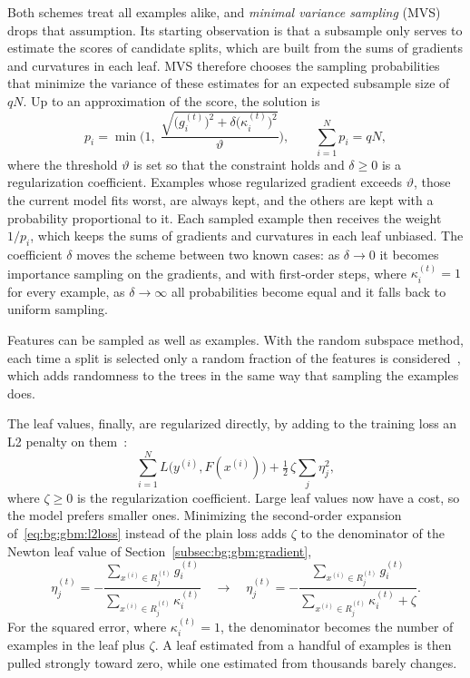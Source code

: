 Both schemes treat all examples alike, and \emph{minimal variance sampling}
(MVS)~\cite{ibragimov2019} drops that assumption. Its starting observation is
that a subsample only serves to estimate the scores of candidate splits, which
are built from the sums of gradients and curvatures in each leaf. MVS
therefore chooses the sampling probabilities that minimize the variance of
these estimates for an expected subsample size of $qN$. Up to an
approximation of the score, the solution is
\begin{equation}
p_i = \min\Biggl( 1,\;
\frac{\sqrt{\bigl(g_i^{(t)}\bigr)^2 + \delta \bigl(\kappa_i^{(t)}\bigr)^2}}{\vartheta} \Biggr),
\qquad \sum_{i=1}^{N} p_i = qN,
\label{eq:bg:gbm:mvs}
\end{equation}
where the threshold $\vartheta$ is set so that the constraint holds and
$\delta \ge 0$ is a regularization coefficient. Examples
whose regularized gradient exceeds $\vartheta$, those the current model fits
worst, are always kept, and the others are kept with a probability
proportional to it. Each sampled example then receives the weight $1/p_i$,
which keeps the sums of gradients and curvatures in each leaf unbiased. The
coefficient $\delta$ moves the scheme between two known cases: as $\delta \to
0$ it becomes importance sampling on the gradients, and with first-order
steps, where $\kappa_i^{(t)} = 1$ for every example, as $\delta \to \infty$
all probabilities become equal and it falls back to uniform sampling.

Features can be sampled as well as examples. With the random subspace method,
each time a split is selected only a random fraction of the features is
considered~\cite{catboostdocs}, which adds randomness to the trees in the same
way that sampling the examples does.

The leaf values, finally, are regularized directly, by adding to the training
loss an L2 penalty on them~\cite{chen2016}:
\begin{equation}
\sum_{i=1}^{N} L\bigl(y^{(i)}, F(x^{(i)})\bigr)
+ \tfrac{1}{2}\, \zeta \sum_{j} \eta_j^{2},
\label{eq:bg:gbm:l2loss}
\end{equation}
where $\zeta \ge 0$ is the regularization coefficient. Large leaf values now
have a cost, so the model prefers smaller ones. Minimizing the second-order
expansion of~\eqref{eq:bg:gbm:l2loss} instead of the plain loss adds $\zeta$
to the denominator of the Newton leaf value of
Section~\ref{subsec:bg:gbm:gradient},
\begin{equation}
\eta_j^{(t)} =
-\frac{\sum_{x^{(i)} \in R_j^{(t)}} g_i^{(t)}}
      {\sum_{x^{(i)} \in R_j^{(t)}} \kappa_i^{(t)}}
\quad \longrightarrow \quad
\eta_j^{(t)} =
-\frac{\sum_{x^{(i)} \in R_j^{(t)}} g_i^{(t)}}
      {\sum_{x^{(i)} \in R_j^{(t)}} \kappa_i^{(t)} + \zeta}.
\label{eq:bg:gbm:l2leaf}
\end{equation}
For the squared error, where $\kappa_i^{(t)} = 1$, the denominator becomes the
number of examples in the leaf plus $\zeta$. A leaf estimated from a handful
of examples is then pulled strongly toward zero, while one estimated from
thousands barely changes.

